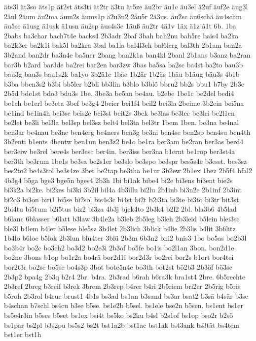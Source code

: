 {äts3l
ät3so
äts1p
ät2st
äts3ti
ät2tr
ä3tu
ät5ze
äu2br
äu1c
äu3el
ä2uf
äuf2e
äug3l
2äul
2äum
äu2ma
äum2s
äums1p
ä2u3n2
2äu5r
2ä3us.
äu2sc
äu6schä
äu4schm
äu5se
ä1usg
ä1usk
ä1usn
äu2sp
äus4s3c
1äuß
äu2tr
4ä1v
1äx
ä1z
â1t
6b.
1ba
2babs
ba3char
bach7t4e
backs4
2b3adr
2baf
3bah
bah2nu
bah5re
bais4
ba2ka
ba2k3er
ba2k1i
bak5l
ba2kra
3bal
ba1la
bal4l3eh
bal6lerg
bal3th
2b1am
ban2a
3b2and
ban2dr
ba3n4e
ba5ner
2bang
ban2k1a
ban4kl
2banl
2b1ans
b3anz
ba2ran
bar3b
b2ard
bar3de
ba2rei
bar2en
bar3zw
3bas
ba5sa
ba2sc
ba4st
ba2to
bau3b
bau3g
bau3s
bau1s2k
ba1yo
3b2ä1c
1bäe
1b2är
1b2äs
1bäu
b1äug
bäu3s
4b1b
b3ba
bben3s2
b3bi
bb5ler
b2bli
bb3lin
b3blo
b3blö
bbru2
bb2s
bbu1
b7by
2b3c
2b5d
bde1st
bdo3
bdu3s
1be.
3be3a
be5an
be4au.
b2ebe
1be1c
be2del
bedi4
be1eh
be1erl
be3eta
3bef
be3g4
2beier
bei1f4
beil2
bei3la
2beime
3b2ein
bei5na
be1ind
be1in4h
bei3sc
beis2e
bei3st
beit2s
3bek
be3las
be3lec
be3lei
be2l1en
be2let
be3li
bel3la
bel3sp
bel3sz
belt4
bel3ta
bel3tr
1bem
1ben.
be3na
be4nal
ben3ar
be4nau
be3ne
ben4erg
be4ners
ben3g
be3ni
ben4se
ben2sp
ben4su
ben4th
3b2enti
b1ents
4bentw
ben1un
ben3z2
be1o
be1ra
ber3am
be2ran
ber3as
berd4
ber3eiw
be3rel
bere4s
ber3esc
ber4in.
ber3iss
ber3na
b1ernt
be1rop
ber3st4a
ber3th
be3rum
1be1s
be3sa
be2s1er
be3slo
be3spo
be3spr
bes5s4e
b3esst.
bes3sz
bes2to2
be4s3tol
be3s4ze
3bet
be2tap
be3tha
be1ur
3b2ew
2b1ex
1bez
2b5f4
bfal2
4b3g4
b5ga
bge3
bge5n
bges4
2b3h
1bi
bi1ak
bibe4
bi2e
bi3ens
bi3ent
bie2s
bi3k2a
bi2ke.
bi2kes
bi3ki
3b2il
bil4a
4b3illu
bi2lu
2b1inb
bi3n2e
2b1inf
2b3int
bi2o3
bi3on
biri1
bi5se
bi2sol
bis4s3c
bi4st
bi2t
b2i3ta
bi3te
bi3to
bi3tr
bit3st
2bi4tu
bi5tum
b2i5tus
biz2
bi3za
4b3j
bjek4to
2b3k4
b2l2
2bl.
bla3b6
4b5lad
b6lanc
6blasser
b6latt
b3law
3b4le2a
b3leb
2b5leg
b3leh
2b3leid
b5lein
blei3sc
ble3l
b4lem
b4ler
b5lese
ble5sz
3b4let
2b3lich
3blick
b4lie
2b3lis
b4lit
3b6litz
1b4lo
b6loc
b5lok
2b3lun
blu4ter
3blü
2b3m
6b3n2
bni2
bnis3
1bo
bo5as
bo2b3l
bo3b4r
bo2c
bo3ch2
bo3d2
bo2e3i
2b3of
bo5fe
bo1is
bo2l1an
3bon.
bon2d1e
bo2ne
3bons
b1op
bo1r2a
bo4rä
bor2d1i
bor2d3r
bo2rei
bor2s
b1ort
bor4tei
bor2t3r
bo2sc
bo5se
bo4s3p
3bot
bote5n4e
bo3th
bot2st
bö2b3
2b3öf
bö3sc
2b3p2
bpa4g
2b3q
b2r4
2br.
b4ra.
2b3rad
b6rah
b6ra3k
bra1st4
2bre.
6b5rechte
2b3ref
2breg
b3reif
b3rek
3brem
2b3rep
b4rer
b4ri
2b5riem
bri2er
2b5rig
b5ris
b5roh
2b3rol
b4ruc
brust1
4b1s
bs3ad
bs1an
b3sand
bs3ar
bsat2
b3sä
b4sär
b3sc
b4schan
b7schl
bs4cu
b3se
b5se.
bs1e2b
b5sel.
bs1ele
bse2n
b5sen.
bs1ent
bs1er
bs5e4r3in
b5ses
b5set
bs1ex
bsi4t
bs5ko
bs2ku
b4sl
b2s1of
bs1op
bso2r
b2sö
bs1par
bs2pl
b3s2pu
bs5s2
bs2t
bst1a2b
bst1ac
bst1ak
bst3ank
bs3tät
bs4tem
bst1er
bst1h
}
